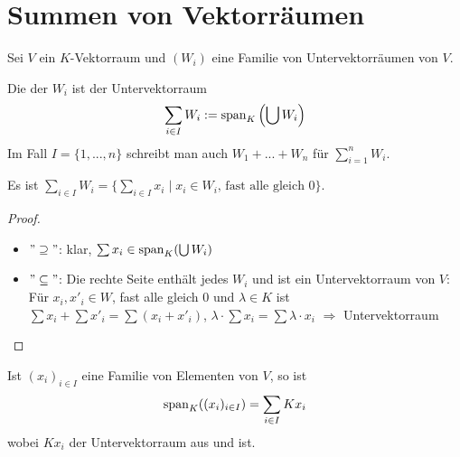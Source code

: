 \section{Summen von Vektorräumen}

Sei $V$ ein $K$-Vektorraum und $(W_i)$ eine Familie von Untervektorräumen von $V$.

\begin{definition}
	Die  der $W_i$ ist der Untervektorraum
	\begin{align}
		\sum_{i\in I} W_i := \operatorname{span}_K\left(\bigcup W_i\right)\notag
	\end{align} 
	Im Fall $I=\{1,...,n\}$ schreibt man auch $W_1+...+W_n$ für $\sum_{i=1}^n W_i$. 
\end{definition}

\begin{lemma}
	Es ist $\sum_{i\in I} W_i = \{\sum_{i\in I} x_i \mid x_i\in W_i\text{, fast alle 
		gleich 0}\}$. 
\end{lemma}
\begin{proof}
	\begin{itemize}
		\item $"\supseteq"$: klar, $\sum x_i \in \operatorname{span}_K(\bigcup W_i)$
		\item $"\subseteq"$: Die rechte Seite enthält jedes $W_i$ und ist ein Untervektorraum von $V$: \\
		Für $x_i,x'_i \in W$, fast alle gleich 0 und $\lambda \in K$ ist $\sum x_i + \sum x'_i = \sum (x_i+x'_i)$, $\lambda
		\cdot \sum x_i = \sum \lambda\cdot x_i$ $\Rightarrow$ Untervektorraum
	\end{itemize}
\end{proof}

\begin{example}
	Ist $(x_i)_{i\in I}$ eine Familie von Elementen von $V$, so ist
	\begin{align}
		\operatorname{span}_K((x_i)_{i\in I})=\sum_{i\in I} Kx_i\notag
	\end{align}
	wobei $Kx_i$ der Untervektorraum aus  und  ist.
\end{example}

